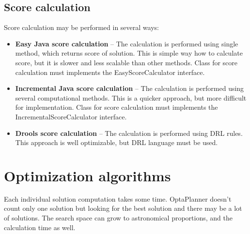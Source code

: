 \subsection{Score calculation}
Score calculation may be performed in several ways:
\begin{itemize}
\item \textbf{Easy Java score calculation} -- The calculation is performed using single method, which returns score of solution. This is simple way how to calculate score, but it is slower and less scalable than other methods. Class for score calculation must implements the EasyScoreCalculator interface.
\item \textbf{Incremental Java score calculation} -- The calculation is performed using several computational methods. This is a quicker approach, but more difficult for implementation. Class for score calculation must implements the IncrementalScoreCalculator interface.
\item \textbf{Drools score calculation} -- The calculation is performed using DRL rules. This approach is well optimizable, but DRL language must be used.
\end{itemize}

\section{Optimization algorithms}\label{optimalAlg}
Each individual solution computation takes some time. OptaPlanner doesn't count only one solution but looking for the best solution and there may be a lot of solutions. The search space can grow to astronomical proportions, and the calculation time as well.

